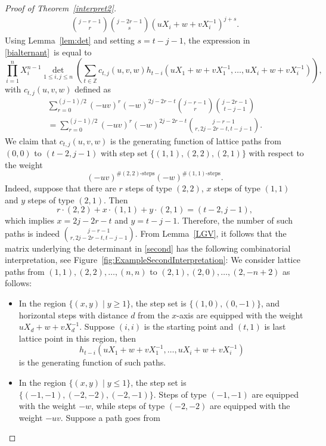 \documentclass[12pt]{amsart}
\theoremstyle{definition}
\numberwithin{equation}{section}
\begin{document}
\begin{proof}[Proof of Theorem~\ref{interpret2}]
\begin{multline*}
		\binom{j-r-1}{r} \binom{j-2r-1}{s} (u X_i +w + v X_i^{-1})^{j+s}.
	\end{multline*}  
	Using Lemma~\ref{lem:det} and setting $s=t-j-1$, the expression in \eqref{bialternant} is equal to  
	\begin{equation}
		\label{second}
		\prod_{i=1}^n X_i^{n-1} 
		\det_{1 \le i,j \le n} \left( \sum_{t\in\mathbb{Z}} 
		c_{t,j}(u,v,w) 
		h_{t-i}(u X_1 + w + v X_1^{-1},\ldots,u X_i + w + v X_i^{-1}) \right),
	\end{equation} 
	with $c_{t,j}(u,v,w)$ defined as
	\begin{multline} 
		\label{def_ctj}
		\sum_{r=0}^{(j-1)/2}  (-uv)^r (-w)^{2j-2r-t} 
		\binom{j-r-1}{r} \binom{j-2r-1}{t-j-1} \\
		= \sum_{r=0}^{(j-1)/2} (-uv)^r (-w)^{2j-2r-t} \binom{j-r-1}{r,2j-2r-t,t-j-1}.
	\end{multline}
	We claim that $c_{t,j}(u,v,w)$ is the generating function of lattice paths from $(0,0)$ to $(t-2,j-1)$ with 
	step set $\{(1,1),(2,2),(2,1)\}$ with respect to the weight 
	\begin{equation*}
	(-uv)^{\# (2,2)\text{-steps}}(-w)^{\# (1,1)\text{-steps}}.
	\end{equation*}
	Indeed, suppose that there are $r$ steps of type $(2,2)$, $x$ steps of type $(1,1)$ and $y$ steps of type $(2,1)$. Then 
	\begin{equation*}
	r \cdot (2,2) + x \cdot (1,1) + y \cdot (2,1) = (t-2,j-1),
	\end{equation*}
	which implies $x=2j-2r-t$ and $y=t-j-1$. Therefore, the number of such paths is indeed $\binom{j-r-1}{r,2j-2r-t,t-j-1}$. From Lemma~\ref{LGV}, it follows that the matrix underlying the determinant in \eqref{second} has the following combinatorial interpretation, see Figure~\ref{fig:ExampleSecondInterpretation}: We consider lattice paths from $(1,1),(2,2),\ldots,(n,n)$ to $(2,1),(2,0),\ldots,(2,-n+2)$ as follows:
	\begin{itemize} 
		\item In the region $\{(x,y) \mid y \ge 1\}$, the step set is $\{(1,0),(0,-1)\}$, and horizontal steps with distance $d$ from the $x$-axis are equipped with the weight $u X_d + w + v X_d^{-1}$. Suppose $(i,i)$ is the starting point and $(t,1)$ is last lattice point in this region, then 
		\begin{equation*}
		h_{t-i}(u X_1 + w + v X_1^{-1},\ldots,u X_i + w + v X_i^{-1})
		\end{equation*}
		is the generating function of such paths.
		\item In the region $\{(x,y) \mid y \le 1\}$, the step set is $\{(-1,-1),(-2,-2),(-2,-1)\}$. Steps of type $(-1,-1)$ are equipped with the weight $-w$, while steps of type $(-2,-2)$ are equipped with the weight $-u v$.  Suppose a path goes from 

\end{itemize}
\end{proof}
\end{document}
